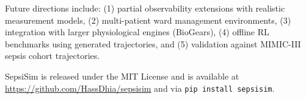 \documentclass[11pt,a4paper]{article}
\begin{document}
Future directions include: (1) partial observability extensions with realistic measurement models, (2) multi-patient ward management environments, (3) integration with larger physiological engines (BioGears), (4) offline RL benchmarks using generated trajectories, and (5) validation against MIMIC-III sepsis cohort trajectories.

SepsiSim is released under the MIT License and is available at \url{https://github.com/HassDhia/sepsisim} and via \texttt{pip install sepsisim}.


\end{document}
